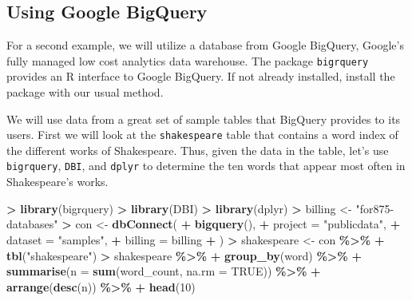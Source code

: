 \documentclass[
]{krantz}
\makeatletter
\newenvironment{Shaded}{\begin{snugshade}}{\end{snugshade}}
\newcommand{\DataTypeTok}[1]{\textcolor[rgb]{0.27,0.27,0.27}{#1}}
\newcommand{\DecValTok}[1]{\textcolor[rgb]{0.06,0.06,0.06}{#1}}
\newcommand{\KeywordTok}[1]{\textcolor[rgb]{0.27,0.27,0.27}{\textbf{#1}}}
\newcommand{\NormalTok}[1]{#1}
\newcommand{\OperatorTok}[1]{\textcolor[rgb]{0.43,0.43,0.43}{\textbf{#1}}}
\newcommand{\OtherTok}[1]{\textcolor[rgb]{0.37,0.37,0.37}{#1}}
\newcommand{\StringTok}[1]{\textcolor[rgb]{0.5,0.5,0.5}{#1}}
\newenvironment{kframe}{%
\medskip{}
\setlength{\fboxsep}{.8em}
 \def\at@end@of@kframe{}%
 \ifinner\ifhmode%
  \def\at@end@of@kframe{\end{minipage}}%
  \begin{minipage}{\columnwidth}%
 \fi\fi%
 \def\FrameCommand##1{\hskip\@totalleftmargin \hskip-\fboxsep
 \colorbox{shadecolor}{##1}\hskip-\fboxsep
     \hskip-\linewidth \hskip-\@totalleftmargin \hskip\columnwidth}%
 \MakeFramed {\advance\hsize-\width
   \@totalleftmargin\z@ \linewidth\hsize
   \@setminipage}}%
 {\par\unskip\endMakeFramed%
 \at@end@of@kframe}
\renewenvironment{Shaded}{\begin{kframe}}{\end{kframe}}
\makeatother
\begin{document}
\hypertarget{using-google-bigquery}{%
\subsection{Using Google BigQuery}\label{using-google-bigquery}}

For a second example, we will utilize a database from Google BigQuery, Google's fully managed low cost analytics data warehouse. The package \texttt{bigrquery} provides an R interface to Google BigQuery. If not already installed, install the package with our usual method.

We will use data from a great set of sample tables that BigQuery provides to its users. First we will look at the \texttt{shakespeare} table that contains a word index of the different works of Shakespeare. Thus, given the data in the table, let's use \texttt{bigrquery}, \texttt{DBI}, and \texttt{dplyr} to determine the ten words that appear most often in Shakespeare's works.

\begin{Shaded}
\begin{Highlighting}[]
\OperatorTok{\textgreater{}}\StringTok{ }\KeywordTok{library}\NormalTok{(bigrquery)}
\OperatorTok{\textgreater{}}\StringTok{ }\KeywordTok{library}\NormalTok{(DBI)}
\OperatorTok{\textgreater{}}\StringTok{ }\KeywordTok{library}\NormalTok{(dplyr)}
\OperatorTok{\textgreater{}}\StringTok{ }\NormalTok{billing \textless{}{-}}\StringTok{ "for875{-}databases"}
\OperatorTok{\textgreater{}}\StringTok{ }\NormalTok{con \textless{}{-}}\StringTok{ }\KeywordTok{dbConnect}\NormalTok{(}
\OperatorTok{+}\StringTok{   }\KeywordTok{bigquery}\NormalTok{(),}
\OperatorTok{+}\StringTok{   }\DataTypeTok{project =} \StringTok{"publicdata"}\NormalTok{,}
\OperatorTok{+}\StringTok{   }\DataTypeTok{dataset =} \StringTok{"samples"}\NormalTok{,}
\OperatorTok{+}\StringTok{   }\DataTypeTok{billing =}\NormalTok{ billing}
\OperatorTok{+}\StringTok{ }\NormalTok{)}
\OperatorTok{\textgreater{}}\StringTok{ }\NormalTok{shakespeare \textless{}{-}}\StringTok{ }\NormalTok{con }\OperatorTok{\%\textgreater{}\%}
\OperatorTok{+}\StringTok{   }\KeywordTok{tbl}\NormalTok{(}\StringTok{"shakespeare"}\NormalTok{)}
\OperatorTok{\textgreater{}}\StringTok{ }\NormalTok{shakespeare }\OperatorTok{\%\textgreater{}\%}
\OperatorTok{+}\StringTok{   }\KeywordTok{group\_by}\NormalTok{(word) }\OperatorTok{\%\textgreater{}\%}
\OperatorTok{+}\StringTok{   }\KeywordTok{summarise}\NormalTok{(}\DataTypeTok{n =} \KeywordTok{sum}\NormalTok{(word\_count, }\DataTypeTok{na.rm =} \OtherTok{TRUE}\NormalTok{)) }\OperatorTok{\%\textgreater{}\%}
\OperatorTok{+}\StringTok{   }\KeywordTok{arrange}\NormalTok{(}\KeywordTok{desc}\NormalTok{(n)) }\OperatorTok{\%\textgreater{}\%}
\OperatorTok{+}\StringTok{   }\KeywordTok{head}\NormalTok{(}\DecValTok{10}\NormalTok{)}
\end{Highlighting}
\end{Shaded}
\end{document}
